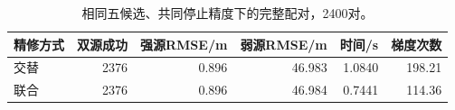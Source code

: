 \begin{table}[htbp]\centering\small
\caption{相同五候选、共同停止精度下的完整配对，2400对。}\label{tab:fivepair}
\begin{tabular}{@{}lrrrrr@{}}\toprule
精修方式 & 双源成功 & 强源RMSE/m & 弱源RMSE/m & 时间/s & 梯度次数\\\midrule
交替 & 2376 & 0.896 & 46.983 & 1.0840 & 198.21\\
联合 & 2376 & 0.896 & 46.984 & 0.7441 & 114.36\\
\bottomrule\end{tabular}\end{table}
